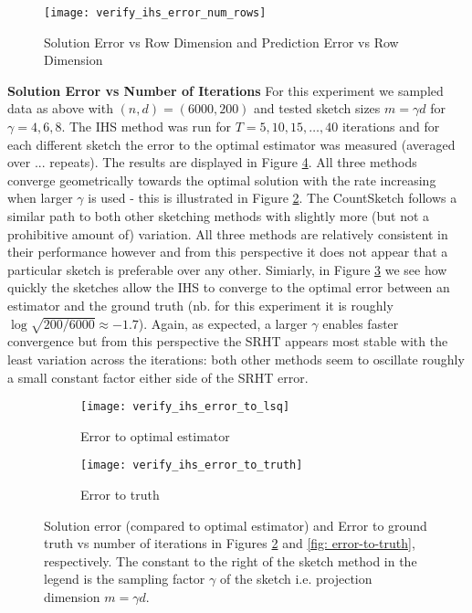 \begin{figure}
  \centering
  \texttt{[image: verify\_ihs\_error\_num\_rows]}
  \caption{Solution Error vs Row Dimension and Prediction Error vs Row Dimension}
  \label{fig: error-vs-row-dim}
\end{figure}


\textbf{Solution Error vs Number of Iterations}
For this experiment we sampled data as above with $(n,d) = (6000,200)$
and tested sketch sizes $m = \gamma d$ for $\gamma = 4,6,8$.
The IHS method was run for $T=5,10,15, \ldots, 40$ iterations and for each
different sketch the error to the optimal estimator was measured (averaged
over ... repeats).
The results are displayed in Figure \ref{fig: ihs-sketch-errors}.
All three methods converge geometrically towards the optimal solution with
the rate increasing when larger $\gamma$ is used - this is illustrated in
Figure \ref{fig: error-to-lsq}.
The CountSketch follows a similar path to both other sketching methods
with slightly more (but not a prohibitive amount of) variation.
All three methods are relatively consistent in their performance however and
from this perspective it does not appear that a particular sketch is preferable
over any other.
Simiarly, in Figure \ref{fig: error-to-truth} we see how quickly the sketches
allow the IHS to converge to the optimal error between an estimator and the
ground truth (nb. for this experiment it is roughly $\log \sqrt{200/6000}
\approx -1.7$).
Again, as expected, a larger $\gamma$ enables faster convergence but from
this perspective the SRHT appears most stable with the least variation across
the iterations: both other methods seem to oscillate roughly a small constant
factor either side of the SRHT error.


\begin{figure}
    \centering
    \begin{subfigure}{0.49\textwidth}
    \centering
        \texttt{[image: verify\_ihs\_error\_to\_lsq]}
        \caption{Error to optimal estimator}
        \label{fig: error-to-lsq}
    \end{subfigure}%
    \begin{subfigure}{0.49\textwidth}
    \centering
        \texttt{[image: verify\_ihs\_error\_to\_truth]}
        \caption{Error to truth}
        \label{fig: error-to-truth}
    \end{subfigure}
    \caption{Solution error (compared to optimal estimator) and Error to
    ground truth vs number of
    iterations in Figures \ref{fig: error-to-lsq} and \ref{fig:
    error-to-truth}, respectively.
    The constant to the right of the sketch method in the legend
    is the sampling factor $\gamma$ of the sketch i.e. projection dimension
    $m = \gamma d$.}
    \label{fig: ihs-sketch-errors}
\end{figure}




